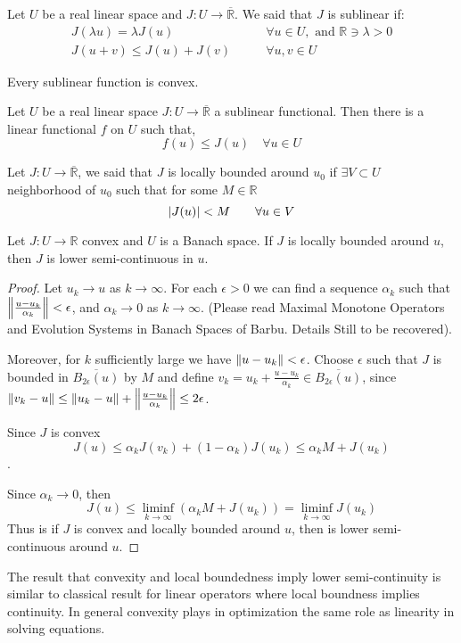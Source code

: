 \begin{definition}
	Let $U$ be a real linear space and $J:U\rightarrow \overline{\mathbb{R}}$. We said that $J$ is sublinear if:
	\begin{align*}
		J(\lambda u)=\lambda J(u) & \qquad  \forall u \in U, \text{ and } \mathbb{R}\ni \lambda>0 \\
		J(u+v)\leq J(u)+J(v) & \qquad \forall u, v \in U
	\end{align*}
	\begin{remark}
		Every sublinear function is convex.
	\end{remark}
\end{definition}
\begin{theorem}
	Let $U$ be a real linear space $J: U\rightarrow \overline{\mathbb{R}}$ a sublinear functional. Then there is a linear functional $f$ on $U$ such that,
	\[
		f(u)\leq J(u) \quad \forall u \in U
	\]
\end{theorem}

\begin{definition}
	Let $J:U\rightarrow \overline{\mathbb{R}}$, we said that $J$ is locally bounded around $u_0$ if $\exists V\subset U$ neighborhood of $u_0$ such that for some $M \in \mathbb{R}$
	\[
		\left|J(u)\right| < M \qquad \forall u \in V
	\]
\end{definition}
\begin{lemma}
	Let $J:U\rightarrow \mathbb{R}$ convex and $U$ is a Banach space. If $J$ is locally bounded around $u$, then $J$ is lower semi-continuous in $u$.
	\begin{proof}
		Let $u_k \rightarrow u$ as $k\rightarrow\infty$. For each $\epsilon > 0$ we can find a sequence $\alpha_k$ such that $\left\lVert\frac{u-u_k}{\alpha_k}\right\rVert< \epsilon$, and $\alpha_k \rightarrow 0$ as $k\rightarrow \infty$. (Please read Maximal Monotone Operators and Evolution Systems
		in Banach Spaces of Barbu. Details Still to be recovered).
		
		Moreover, for $k$ sufficiently large we have $\left\lVert u-u_k\right\rVert<\epsilon$. Choose $\epsilon$ such that $J$ is bounded in $\overline{B_{2\epsilon}(u)}$ by $M$ and define $v_k = u_k + \frac{u-u_k}{\alpha_k} \in \overline{B_{2\epsilon}(u)}$, since  $\left\lVert v_k-u\right\rVert\leq \left\lVert u_k-u\right\rVert+\left\lVert\frac{u-u_k}{\alpha_k}\right\rVert\leq 2\epsilon$. 
		
		Since $J$ is convex \[J(u)\leq \alpha_k J(v_k) + (1-\alpha_k)J(u_k) \leq \alpha_k M+J(u_k)\].
		
		Since $\alpha_k \rightarrow 0$, then
		\[J(u)\leq \liminf_{k\rightarrow \infty}(\alpha_kM+J(u_k)) = \liminf_{k\rightarrow\infty} J(u_k) \]
		Thus is if $J$ is convex and locally bounded around $u$, then is lower semi-continuous around $u$.
	\end{proof}
\end{lemma}
\begin{remark}
	The result that convexity and local boundedness imply lower semi-continuity is similar to classical result for linear operators where local boundness implies continuity. In general convexity plays in optimization the same role as linearity in solving equations.
\end{remark}